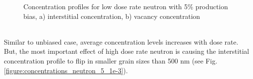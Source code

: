 \documentclass[a4paper]{article}
\begin{document}
\begin{figure}[h!]
      \caption{Concentration profiles for low dose rate neutron with 5\% production bias, a) interstitial concentration, b) vacancy concentration}
      \label{figure:concentrations_neutron_5_1e-6}
    \end{figure}\\

    Similar to unbiased case, average concentration levels increases with dose rate. But, the most important effect of high dose rate neutron is causing the interstitial concentration profile to flip in smaller grain sizes than 500 nm (see Fig. \ref{figure:concentrations_neutron_5_1e-3}).\\
    \begin{figure}[htb!]  %
      \centering
      \qquad

\end{figure}
\end{document}
